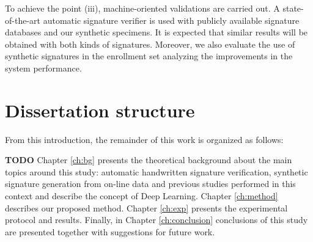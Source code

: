 To achieve the point (iii), machine-oriented validations are carried out. A state-of-the-art automatic signature verifier is used with publicly available signature databases and our synthetic specimens. It is expected that similar results will be obtained with both kinds of signatures. Moreover, we also evaluate the use of synthetic signatures in the enrollment set analyzing the improvements in the system performance. 

\section{Dissertation structure}
From this introduction, the remainder of this work is organized as follows:

\textbf{TODO}
Chapter \ref{ch:bg} presents the theoretical background about the main topics around this
study: automatic handwritten signature verification, synthetic signature generation from on-line data and previous studies performed in this context and describe the concept of Deep Learning. Chapter \ref{ch:method} describes our proposed method. Chapter \ref{ch:exp} presents the experimental protocol and results. Finally, in Chapter \ref{ch:conclusion} conclusions of this study are presented together with suggestions for future work.





